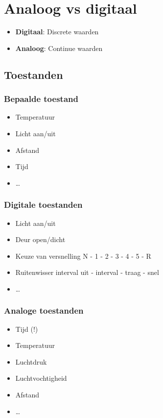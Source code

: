 \documentclass{article}
\newcommand{\bold}[1]{\textbf{#1}}
\begin{document}
\section{Analoog vs digitaal}
\begin{itemize}
    \item \bold{Digitaal}: Discrete waarden
    \item \bold{Analoog}: Continue waarden
\end{itemize}
\subsection{Toestanden}
\subsubsection{Bepaalde toestand}
\begin{itemize}
    \item Temperatuur
    \item Licht aan/uit
    \item Afstand
    \item Tijd
    \item \dots
\end{itemize}

\subsubsection{Digitale toestanden}
\begin{itemize}
    \item Licht aan/uit
    \item Deur open/dicht
    \item Keuze van versnelling N - 1 - 2 - 3 - 4 - 5 - R
    \item Ruitenwisser interval uit - interval - traag - snel
    \item \dots
\end{itemize}

\subsubsection{Analoge toestanden}
\begin{itemize}
    \item Tijd (!)
    \item Temperatuur
    \item Luchtdruk
    \item Luchtvochtigheid
    \item Afstand
    \item \dots
\end{itemize}
\end{document}

